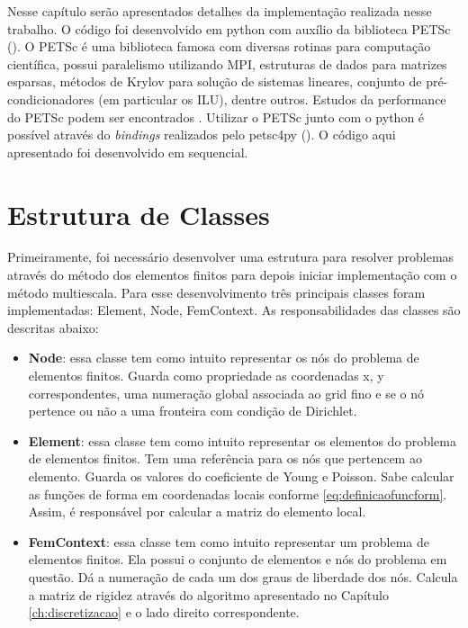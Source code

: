 Nesse capítulo serão apresentados detalhes da implementação realizada nesse trabalho. O código foi desenvolvido em python com auxílio da biblioteca PETSc (\citet{petsc-user-ref}). O PETSc é uma biblioteca famosa com diversas rotinas para computação científica, possui paralelismo utilizando MPI, estruturas de dados para matrizes esparsas, métodos de Krylov para solução de sistemas lineares, conjunto de pré-condicionadores (em particular os ILU), dentre outros. Estudos da performance do PETSc podem ser encontrados \citet{petsc-efficient}. Utilizar o PETSc junto com o python é possível através do \textit{bindings} realizados pelo petsc4py (\citet{Dalcin2011}). O código aqui apresentado foi desenvolvido em sequencial. 



\section{Estrutura de Classes}

Primeiramente, foi necessário desenvolver uma estrutura para resolver problemas através do método dos elementos finitos para depois iniciar implementação com o método multiescala. Para esse desenvolvimento três principais classes foram implementadas: Element, Node, FemContext. As responsabilidades das classes são descritas abaixo:

\begin{itemize}
    \item \textbf{Node}: essa classe tem como intuito representar os nós do problema de elementos finitos. Guarda como propriedade as coordenadas x, y correspondentes, uma numeração global associada ao grid fino e se o nó pertence ou não a uma fronteira com condição de Dirichlet.
    \item \textbf{Element}: essa classe tem como intuito representar os elementos do problema de elementos finitos. Tem uma referência para os nós que pertencem ao elemento. Guarda os valores do coeficiente de Young e Poisson. Sabe calcular as funções de forma em coordenadas locais conforme \eqref{eq:definicaofuncform}. Assim, é responsável por calcular a matriz do elemento local.
    \item \textbf{FemContext}: essa classe tem como intuito representar um problema de elementos finitos. Ela possui o conjunto de elementos e nós do problema em questão. Dá a numeração de cada um dos graus de liberdade dos nós. Calcula a matriz de rigidez através do algoritmo apresentado no Capítulo \ref{ch:discretizacao} e o lado direito correspondente. 
\end{itemize}

